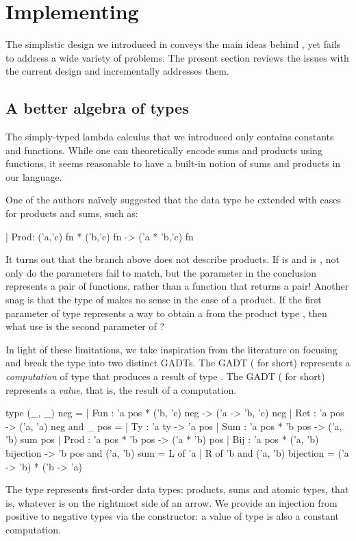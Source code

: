 \section{Implementing \arti}
\label{sec:representation}

The simplistic design we introduced in  conveys the main ideas
behind \arti, yet fails to address a wide variety of problems. The present section
reviews the issues with the current design and incrementally addresses them.

\subsection{A better algebra of types}
\label{sec:algebra}

The simply-typed lambda calculus that we introduced only contains constants and
functions. While one can theoretically encode sums and products using functions,
it seems reasonable to have a built-in notion of sums and products in our
language.

One of the authors naïvely suggested that the data type be extended with cases
for products and sums, such as:
%
\begin{ocamlcode}
| Prod: ('a,'c) fn * ('b,'c) fn -> ('a * 'b,'c) fn
\end{ocamlcode}
%
It turns out that the branch above does not describe products. If  is
 and  is , not only do the
 parameters fail to match, but the  parameter in the
conclusion represents a pair of functions, rather than a function that returns a
pair! Another snag is that the type of  makes no sense in the case of
a product. If the first parameter of type  represents a way to
obtain a  from the product type , then what use is the second
parameter of ?

In light of these limitations, we take inspiration from the literature on
focusing and break the  type into two distinct GADTs.
  The GADT  ( for short) represents a
    \emph{computation} of type  that produces a result of type
    .
  The GADT  ( for short) represents a
    \emph{value}, that is, the result of a computation.
%
\begin{ocamlcode}
type (_, _) neg =
| Fun : 'a pos * ('b, 'c) neg -> ('a -> 'b, 'c) neg
| Ret : 'a pos -> ('a, 'a) neg
and _ pos =
| Ty : 'a ty -> 'a pos
| Sum : 'a pos * 'b pos -> ('a, 'b) sum pos
| Prod : 'a pos  * 'b pos -> ('a * 'b) pos
| Bij : 'a pos * ('a, 'b) bijection -> 'b pos
and ('a, 'b) sum = L of 'a | R of 'b
and ('a, 'b) bijection = ('a -> 'b) * ('b -> 'a)
\end{ocamlcode}
%
The  type represents first-order data types: products, sums and atomic
types, that is, whatever is on the rightmost side of an arrow. We provide an
injection from positive to negative types via the  constructor: a
value of type  is also a constant computation.

